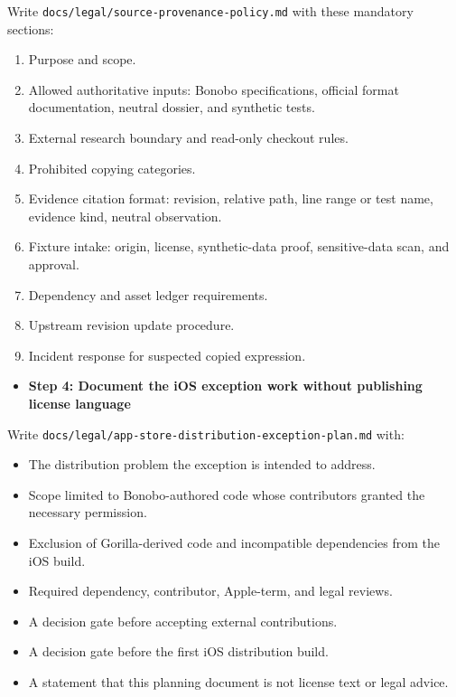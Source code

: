 \documentclass[
  letterpaper,
]{article}
\providecommand{\tightlist}{%
  \setlength{\itemsep}{0pt}\setlength{\parskip}{0pt}}
\begin{document}
Write \nolinkurl{docs/legal/source-provenance-policy.md} with these mandatory sections:

\begin{enumerate}
\def\labelenumi{\arabic{enumi}.}
\tightlist
\item
  Purpose and scope.
\item
  Allowed authoritative inputs: Bonobo specifications, official format documentation, neutral dossier, and synthetic
  tests.
\item
  External research boundary and read-only checkout rules.
\item
  Prohibited copying categories.
\item
  Evidence citation format: revision, relative path, line range or test name, evidence kind, neutral observation.
\item
  Fixture intake: origin, license, synthetic-data proof, sensitive-data scan, and approval.
\item
  Dependency and asset ledger requirements.
\item
  Upstream revision update procedure.
\item
  Incident response for suspected copied expression.
\end{enumerate}

\begin{itemize}
\tightlist
\item[$\boxtimes$]
  \textbf{Step 4: Document the iOS exception work without publishing license language}
\end{itemize}

Write \nolinkurl{docs/legal/app-store-distribution-exception-plan.md} with:

\begin{itemize}
\tightlist
\item
  The distribution problem the exception is intended to address.
\item
  Scope limited to Bonobo-authored code whose contributors granted the necessary permission.
\item
  Exclusion of Gorilla-derived code and incompatible dependencies from the iOS build.
\item
  Required dependency, contributor, Apple-term, and legal reviews.
\item
  A decision gate before accepting external contributions.
\item
  A decision gate before the first iOS distribution build.
\item
  A statement that this planning document is not license text or legal advice.
\end{itemize}
\end{document}
